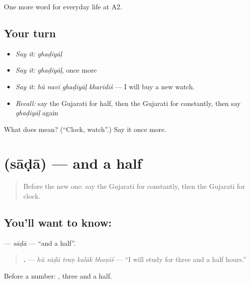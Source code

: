 \begin{grammarlens}[title={What you've built}]
One more word for everyday life at A2.
\end{grammarlens}

\subsection*{Your turn}
\begin{itemize}
\raggedright
  \item \emph{Say it:} \emph{ghaḍiyāḷ}
  \item \emph{Say it:} \emph{ghaḍiyāḷ}, once more
  \item \emph{Say it:} \emph{hũ navī ghaḍiyāḷ kharīdīś} — I will buy a new watch.
  \item \emph{Recall:} say the Gujarati for half, then the Gujarati for constantly, then say \emph{ghaḍiyāḷ} again
\end{itemize}

\begin{tcolorbox}[breakable,colback=teal!4,colframe=teal!35!black,title={Before you move on}]
What does  mean? (\textquotedblleft{}Clock, watch\textquotedblright{}.) Say it once more.
\end{tcolorbox}
\section[\texorpdfstring{\gu{સાડા} (sāḍā)}{સાડા (sāḍā)}]{ (sāḍā) — and a half}

\label{lesson:GU-C176-sada}



\begin{quote}
Before the new one: say the Gujarati for constantly, then the Gujarati for clock.
\end{quote}

\subsection*{You'll want to know: }
\textbf{} — \emph{sāḍā} — \textquotedblleft{}and a half\textquotedblright{}.

\begin{quote}
\textbf{    .} — \emph{hũ sāḍā traṇ kalāk bhaṇīś} — \textquotedblleft{}I will study for three and a half hours.\textquotedblright{}
\end{quote}

Before a number: \textbf{ }, three and a half.

